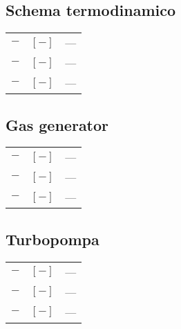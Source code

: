 \begin{multicols}{2}
	\subsection{Schema termodinamico}
	\begin{tabular}{ccl}
		$\bm{-}$ & $[-]$ & --- \\
		$\bm{-}$ & $[-]$ & --- \\
		$\bm{-}$ & $[-]$ & ---
	\end{tabular}

	\subsection{Gas generator}
	\begin{tabular}{ccl}
		$\bm{-}$ & $[-]$ & --- \\
		$\bm{-}$ & $[-]$ & --- \\
		$\bm{-}$ & $[-]$ & ---
	\end{tabular}
	
	\subsection{Turbopompa}
	\begin{tabular}{ccl}
		$\bm{-}$ & $[-]$ & --- \\
		$\bm{-}$ & $[-]$ & --- \\
		$\bm{-}$ & $[-]$ & ---
	\end{tabular}


\end{multicols}
